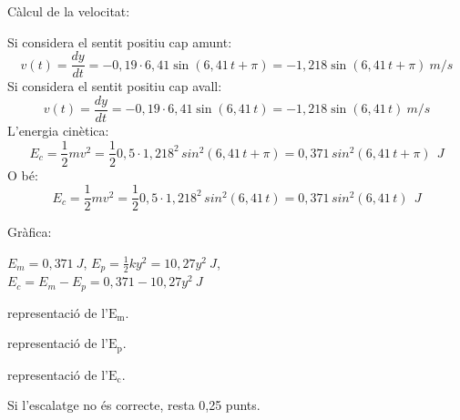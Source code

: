 \begin{solapartat}
 Càlcul de la velocitat:

Si considera el sentit positiu cap amunt:
\[ v(t) = \frac{dy}{dt} = -0,19\cdot 6,41\sin(6,41\,t + \pi) = -1,218\sin(6,41\,t + \pi)\ m/s \]
Si considera el sentit positiu cap avall:
\[ v(t) = \frac{dy}{dt} = -0,19\cdot 6,41\sin(6,41\,t) = -1,218\sin(6,41\,t)\ m/s \]
 L'energia cinètica:
\[ E_c = \frac{1}{2}mv^2 = \frac{1}{2}0,5\cdot 1,218^2\,sin^2(6,41\,t + \pi) = 0,371\,sin^2(6,41\,t + \pi)\ \ J \]
O bé:
\[ E_c = \frac{1}{2}mv^2 = \frac{1}{2}0,5\cdot 1,218^2\,sin^2(6,41\,t) = 0,371\,sin^2(6,41\,t)\ \ J \]

Gràfica:

$E_m = 0,371\ J$, \quad $E_p = \frac{1}{2}ky^2 = 10,27y^2\ J$,\\
$E_c = E_m - E_p = 0,371 - 10,27y^2\ J$

 representació de l'$\mathrm{E_m}$.

 representació de l'$\mathrm{E_p}$.

 representació de l'$\mathrm{E_c}$.

Si l'escalatge no és correcte, resta 0,25 punts.

\end{solapartat}
